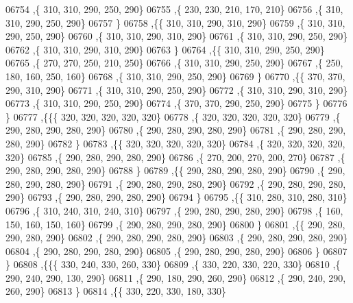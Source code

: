 \begin{DoxyCode}
06754     ,\{   310,   310,   290,   250,   290\}
06755     ,\{   230,   230,   210,   170,   210\}
06756     ,\{   310,   310,   290,   250,   290\}
06757     \}
06758    ,\{\{   310,   310,   290,   310,   290\}
06759     ,\{   310,   310,   290,   250,   290\}
06760     ,\{   310,   310,   290,   310,   290\}
06761     ,\{   310,   310,   290,   250,   290\}
06762     ,\{   310,   310,   290,   310,   290\}
06763     \}
06764    ,\{\{   310,   310,   290,   250,   290\}
06765     ,\{   270,   270,   250,   210,   250\}
06766     ,\{   310,   310,   290,   250,   290\}
06767     ,\{   250,   180,   160,   250,   160\}
06768     ,\{   310,   310,   290,   250,   290\}
06769     \}
06770    ,\{\{   370,   370,   290,   310,   290\}
06771     ,\{   310,   310,   290,   250,   290\}
06772     ,\{   310,   310,   290,   310,   290\}
06773     ,\{   310,   310,   290,   250,   290\}
06774     ,\{   370,   370,   290,   250,   290\}
06775     \}
06776    \}
06777   ,\{\{\{   320,   320,   320,   320,   320\}
06778     ,\{   320,   320,   320,   320,   320\}
06779     ,\{   290,   280,   290,   280,   290\}
06780     ,\{   290,   280,   290,   280,   290\}
06781     ,\{   290,   280,   290,   280,   290\}
06782     \}
06783    ,\{\{   320,   320,   320,   320,   320\}
06784     ,\{   320,   320,   320,   320,   320\}
06785     ,\{   290,   280,   290,   280,   290\}
06786     ,\{   270,   200,   270,   200,   270\}
06787     ,\{   290,   280,   290,   280,   290\}
06788     \}
06789    ,\{\{   290,   280,   290,   280,   290\}
06790     ,\{   290,   280,   290,   280,   290\}
06791     ,\{   290,   280,   290,   280,   290\}
06792     ,\{   290,   280,   290,   280,   290\}
06793     ,\{   290,   280,   290,   280,   290\}
06794     \}
06795    ,\{\{   310,   280,   310,   280,   310\}
06796     ,\{   310,   240,   310,   240,   310\}
06797     ,\{   290,   280,   290,   280,   290\}
06798     ,\{   160,   150,   160,   150,   160\}
06799     ,\{   290,   280,   290,   280,   290\}
06800     \}
06801    ,\{\{   290,   280,   290,   280,   290\}
06802     ,\{   290,   280,   290,   280,   290\}
06803     ,\{   290,   280,   290,   280,   290\}
06804     ,\{   290,   280,   290,   280,   290\}
06805     ,\{   290,   280,   290,   280,   290\}
06806     \}
06807    \}
06808   ,\{\{\{   330,   240,   330,   260,   330\}
06809     ,\{   330,   220,   330,   220,   330\}
06810     ,\{   290,   240,   290,   130,   290\}
06811     ,\{   290,   180,   290,   260,   290\}
06812     ,\{   290,   240,   290,   260,   290\}
06813     \}
06814    ,\{\{   330,   220,   330,   180,   330\}

\end{DoxyCode}
